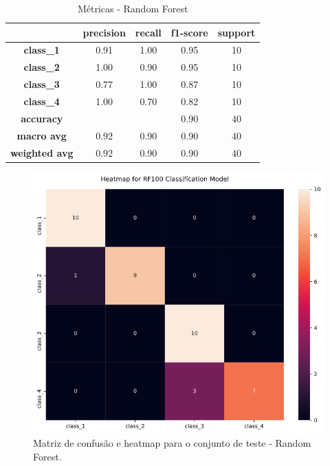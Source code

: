 \documentclass[
	article,			%
	11pt,				%
	oneside,			%
	a4paper,			%
	english,			%
	brazil,				%
	sumario=tradicional
	]{abntex2}
\begin{document}
\begin{table}[]
\centering
\begin{tabular}{c|c|c|c|c|}
\cline{2-5}
                                            & \textbf{precision} & \textbf{recall} & \textbf{f1-score} & \textbf{support} \\ \hline
\multicolumn{1}{|c|}{\textbf{class\_1}}     & 0.91               & 1.00            & 0.95              & 10               \\ \hline
\multicolumn{1}{|c|}{\textbf{class\_2}}     & 1.00               & 0.90            & 0.95              & 10               \\ \hline
\multicolumn{1}{|c|}{\textbf{class\_3}}     & 0.77               & 1.00            & 0.87              & 10               \\ \hline
\multicolumn{1}{|c|}{\textbf{class\_4}}     & 1.00               & 0.70            & 0.82              & 10               \\ \hline
\multicolumn{1}{|c|}{\textbf{accuracy}}     &                    &                 & 0.90              & 40               \\ \hline
\multicolumn{1}{|c|}{\textbf{macro avg}}    & 0.92               & 0.90            & 0.90              & 40               \\ \hline
\multicolumn{1}{|c|}{\textbf{weighted avg}} & 0.92               & 0.90            & 0.90              & 40               \\ \hline
\end{tabular}
\caption{Métricas - Random Forest }
\label{tab:rf_01}
\end{table}

\begin{figure}[h!]
 \centering
 \includegraphics[scale=0.5]{fig/rf_cm.png}
 \caption{Matriz de confusão e heatmap para o conjunto de teste - Random Forest.}
 \label{fig:rf_cm}
\end{figure}
\end{document}
